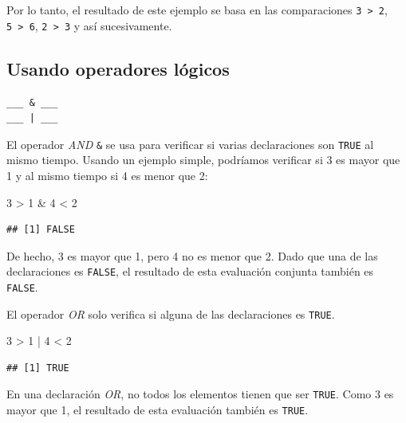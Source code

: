 \documentclass[
]{book}
\newenvironment{Shaded}{\begin{snugshade}}{\end{snugshade}}
\newcommand{\DecValTok}[1]{\textcolor[rgb]{0.00,0.00,0.81}{#1}}
\newcommand{\SpecialCharTok}[1]{\textcolor[rgb]{0.00,0.00,0.00}{#1}}
\begin{document}
Por lo tanto, el resultado de este ejemplo se basa en las comparaciones \texttt{3\ \textgreater{}\ 2}, \texttt{5\ \textgreater{}\ 6}, \texttt{2\ \textgreater{}\ 3} y así sucesivamente.

\hypertarget{usando-operadores-luxf3gicos}{%
\subsection{Usando operadores lógicos}\label{usando-operadores-luxf3gicos}}

\begin{verbatim}
___ & ___
___ | ___
\end{verbatim}

El operador \emph{AND} \texttt{\&} se usa para verificar si varias declaraciones son \texttt{TRUE} al mismo tiempo. Usando un ejemplo simple, podríamos verificar si 3 es mayor que 1 y al mismo tiempo si 4 es menor que 2:

\begin{Shaded}
\begin{Highlighting}[]
\DecValTok{3} \SpecialCharTok{\textgreater{}} \DecValTok{1} \SpecialCharTok{\&} \DecValTok{4} \SpecialCharTok{\textless{}} \DecValTok{2}
\end{Highlighting}
\end{Shaded}

\begin{verbatim}
## [1] FALSE
\end{verbatim}

De hecho, 3 es mayor que 1, pero 4 no es menor que 2. Dado que una de las declaraciones es \texttt{FALSE}, el resultado de esta evaluación conjunta también es \texttt{FALSE}.

El operador \emph{OR} \texttt{\textbar{}} solo verifica si alguna de las declaraciones es \texttt{TRUE}.

\begin{Shaded}
\begin{Highlighting}[]
\DecValTok{3} \SpecialCharTok{\textgreater{}} \DecValTok{1} \SpecialCharTok{|} \DecValTok{4} \SpecialCharTok{\textless{}} \DecValTok{2}
\end{Highlighting}
\end{Shaded}

\begin{verbatim}
## [1] TRUE
\end{verbatim}

En una declaración \emph{OR}, no todos los elementos tienen que ser \texttt{TRUE}. Como 3 es mayor que 1, el resultado de esta evaluación también es \texttt{TRUE}.
\end{document}
